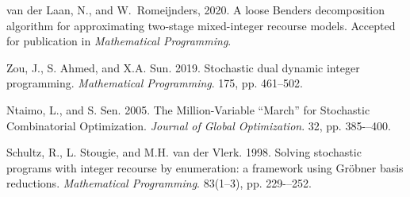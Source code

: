 \documentclass[12pt, english]{article}
\begin{document}
\clearpage

\begin{thebibliography}{9}

	van der Laan, N., and W.\ Romeijnders, 2020. A loose Benders decomposition algorithm for approximating two-stage mixed-integer recourse models. Accepted for publication in \emph{Mathematical Programming}.

	Zou, J., S. Ahmed, and X.A. Sun. 2019. Stochastic dual dynamic integer programming. \emph{Mathematical Programming}. 175, pp. 461--502.

	Ntaimo, L., and S. Sen. 2005. The Million-Variable ``March'' for Stochastic Combinatorial Optimization. \emph{Journal of Global Optimization}. 32, pp. 385-–400.
	
	Schultz, R., L. Stougie, and M.H. van der Vlerk. 1998. Solving stochastic programs with integer recourse by enumeration: a framework using Gr\"obner basis reductions. \emph{Mathematical Programming}. 83(1–3), pp. 229-–252.
	
\end{thebibliography}
	
\end{document}
